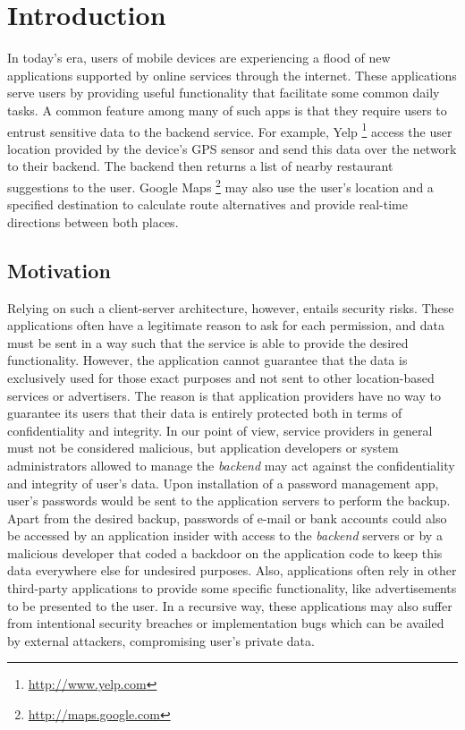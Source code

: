 \chapter{Introduction}

In today's era, users of mobile devices are experiencing a flood of new applications supported by online services through the internet. These applications serve users by providing useful functionality that facilitate some common daily tasks. A common feature among many of such apps is that they require users to entrust sensitive data to the backend service. For example, Yelp \footnote{\url{http://www.yelp.com}} access the user location provided by the device's GPS sensor and send this data over the network to their backend. The backend then returns a list of nearby restaurant suggestions to the user. Google Maps \footnote{\url{http://maps.google.com}} may also use the user's location and a specified destination to calculate route alternatives and provide real-time directions between both places.
 
\section{Motivation}

Relying on such a client-server architecture, however, entails security risks. These applications often have a legitimate reason to ask for each permission, and data must be sent in a way such that the service is able to provide the desired functionality. However, the application cannot guarantee that the data is exclusively used for those exact purposes and not sent to other location-based services or advertisers. The reason is that application providers have no way to guarantee its users that their data is entirely protected both in terms of confidentiality and integrity. In our point of view, service providers in general must not be considered malicious, but application developers or system administrators allowed to manage the \textit{backend} may act against the confidentiality and integrity of user's data. Upon installation of a password management app, user's passwords would be sent to the application servers to perform the backup. Apart from the desired backup, passwords of e-mail or bank accounts could also be accessed by an application insider with access to the \textit{backend} servers or by a malicious developer that coded a backdoor on the application code to keep this data everywhere else for undesired purposes. Also, applications often rely in other third-party applications to provide some specific functionality, like advertisements to be presented to the user. In a recursive way, these applications may also suffer from intentional security breaches or implementation bugs which can be availed by external attackers, compromising user's private data.

